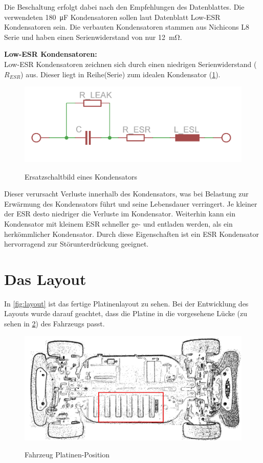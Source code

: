 Die Beschaltung erfolgt dabei nach den Empfehlungen des Datenblattes. Die verwendeten \SI{180}{\micro\farad} Kondensatoren sollen laut Datenblatt Low-ESR Kondensatoren sein. 
Die verbauten Kondensatoren stammen aus Nichicons L8 Serie und haben einen Serienwiderstand von nur \SI{12}{\milli\ohm}.

\textbf{Low-ESR Kondensatoren:\\}
Low-ESR Kondensatoren zeichnen sich durch einen niedrigen Serienwiderstand ($R_{ESR}$) aus.
Dieser liegt in Reihe(Serie) zum idealen Kondensator (\cref{fig:esr}). 

\begin{figure}[H]
\centering
\includegraphics[width=.56\textwidth]{esr.png}\\
\caption{Ersatzschaltbild eines Kondensators}%
\label{fig:esr}
\end{figure}

Dieser verursacht Verluste innerhalb des Kondensators, was bei Belastung zur Erwärmung des Kondensators führt und
seine Lebensdauer verringert. Je kleiner der ESR desto niedriger die Verluste im Kondensator. Weiterhin
kann ein Kondensator mit kleinem ESR schneller ge- und entladen werden, als ein herkömmlicher Kondensator.
Durch diese Eigenschaften ist ein ESR Kondensator hervorragend zur Störunterdrückung geeignet.






\section{Das Layout}
In \cref{fig:layout} ist das fertige Platinenlayout zu sehen. Bei der Entwicklung des Layouts wurde darauf geachtet, dass die Platine in die vorgesehene Lücke (zu sehen in \cref{fig:car_struc}) des Fahrzeugs passt.

\begin{figure}[H]
\centering
\includegraphics[width=.8\textwidth]{auto_struck.png}\\
\caption{Fahrzeug Platinen-Position}%
\label{fig:car_struc}
\end{figure}

